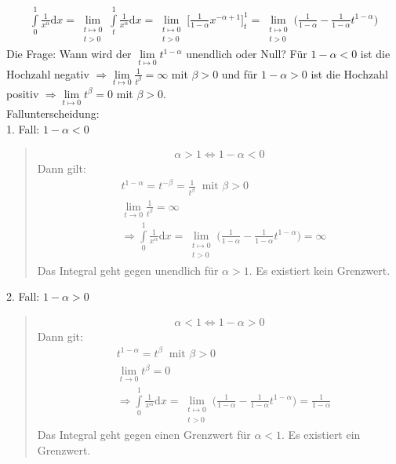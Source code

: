 \begin{align*}
\int\limits_{0}^{1}\frac{1}{x^\alpha} \mathrm{d} x=\lim\limits_{\substack{t\mapsto 0\\t>0}}\int\limits_{t}^{1}\frac{1}{x^\alpha}\mathrm{d}x=\lim\limits_ {\substack{t\mapsto 0\\t>0}} \bigg[\frac{1}{1-\alpha}x^{-\alpha+1}\bigg]^1_t=\lim\limits_ {\substack{t\mapsto 0\\t>0}}\bigg(\frac{1}{1-\alpha}-\frac{1}{1-\alpha}t^{1-\alpha}\bigg)
\end{align*}
Die Frage: Wann wird der $ \lim\limits_ {t\mapsto 0} t^{1-\alpha}$ unendlich oder Null? Für $ 1-\alpha<0 $ ist die Hochzahl negativ $ \Rightarrow \lim\limits_ {t\mapsto 0} \frac{1}{t^\beta}=\infty$ mit $ \beta>0 $ und für $1-\alpha>0  $ ist die Hochzahl positiv $ \Rightarrow \lim\limits_ {t\mapsto 0}t^\beta=0 $ mit $ \beta>0 $.\\
Fallunterscheidung:\\
1. Fall: $ 1-\alpha<0$\\
\begin{quote}
	
	
	\begin{align*}
	\alpha>1\Leftrightarrow 1-\alpha<0
	\end{align*}
	Dann gilt:\\
	\begin{align*}
	&t^{1-\alpha}=t^{-\beta}=\frac{1}{t^\beta} \;\;\text{mit }\beta>0\\
	&\lim\limits_ {t\to 0}\frac{1}{t^\beta}=\infty\\
	&\Rightarrow \int\limits_{0}^{1}\frac{1}{x^\alpha} \mathrm{d} x=\lim\limits_ {\substack{t\mapsto 0\\t>0}}\bigg(\frac{1}{1-\alpha}-\frac{1}{1-\alpha}t^{1-\alpha}\bigg)=\infty
	\end{align*}
	Das Integral geht gegen unendlich für $ \alpha>1 $. Es existiert kein Grenzwert.\\
\end{quote}
2. Fall: $ 1-\alpha>0$\\
\begin{quote}
	\begin{align*}
	\alpha<1\Leftrightarrow 1-\alpha>0
	\end{align*}
	Dann git:\\
	\begin{align*}
	&t^{1-\alpha}=t^\beta \;\;\text{mit }\beta>0\\
	&\lim\limits_ {t\to 0}t^\beta=0\\
	&\Rightarrow \int\limits_{0}^{1}\frac{1}{x^\alpha} \mathrm{d} x=\lim\limits_ {\substack{t\mapsto 0\\t>0}}\bigg(\frac{1}{1-\alpha}-\frac{1}{1-\alpha}t^{1-\alpha}\bigg)=\frac{1}{1-\alpha}
	\end{align*}
	Das Integral geht gegen einen Grenzwert für $ \alpha<1 $. Es existiert ein Grenzwert.\\
\end{quote}

